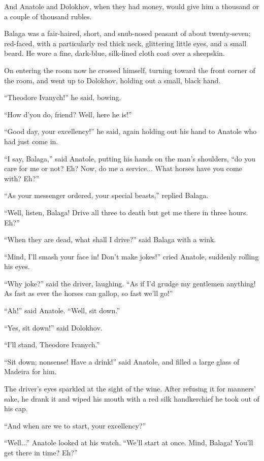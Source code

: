 And Anatole and Dolokhov, when they had money, would give him a
thousand or a couple of thousand rubles.

Balaga was a fair-haired, short, and snub-nosed peasant of about
twenty-seven; red-faced, with a particularly red thick neck,
glittering little eyes, and a small beard. He wore a fine,
dark-blue, silk-lined cloth coat over a sheepskin.

On entering the room now he crossed himself, turning toward the
front corner of the room, and went up to Dolokhov, holding out a
small, black hand.

``Theodore Ivanych!'' he said, bowing.

``How d'you do, friend? Well, here he is!''

``Good day, your excellency!'' he said, again holding out his
hand to Anatole who had just come in.

``I say, Balaga,'' said Anatole, putting his hands on the man's
shoulders, ``do you care for me or not? Eh? Now, do me a
service... What horses have you come with? Eh?''

``As your messenger ordered, your special beasts,'' replied
Balaga.

``Well, listen, Balaga! Drive all three to death but get me there
in three hours. Eh?''

``When they are dead, what shall I drive?'' said Balaga with a
wink.

``Mind, I'll smash your face in! Don't make jokes!'' cried
Anatole, suddenly rolling his eyes.

``Why joke?'' said the driver, laughing. ``As if I'd grudge my
gentlemen anything! As fast as ever the horses can gallop, so
fast we'll go!''

``Ah!'' said Anatole. ``Well, sit down.''

``Yes, sit down!'' said Dolokhov.

``I'll stand, Theodore Ivanych.''

``Sit down; nonsense! Have a drink!'' said Anatole, and filled a
large glass of Madeira for him.

The driver's eyes sparkled at the sight of the wine. After
refusing it for manners' sake, he drank it and wiped his mouth
with a red silk handkerchief he took out of his cap.

``And when are we to start, your excellency?''

``Well...'' Anatole looked at his watch. ``We'll start at
once. Mind, Balaga! You'll get there in time? Eh?''

